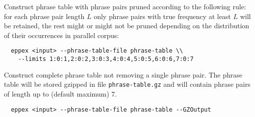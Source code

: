 Construct phrase table with phrase pairs pruned according to the following rule:
for each phrase pair length $L$ only phrase pairs with true frequency at least
$L$ will be retained, the rest might or might not be pruned depending on the
distribution of their occurrences in parallel corpus:
\begin{verbatim}
  eppex <input> --phrase-table-file phrase-table \\
    --limits 1:0:1,2:0:2,3:0:3,4:0:4,5:0:5,6:0:6,7:0:7
\end{verbatim}

Construct complete phrase table not removing a single phrase pair.
The phrase table will be stored gzipped in file \texttt{phrase-table.gz}
and will contain phrase pairs of length up to (default maximum) 7.
\begin{verbatim}
  eppex <input> --phrase-table-file phrase-table --GZOutput
\end{verbatim}
